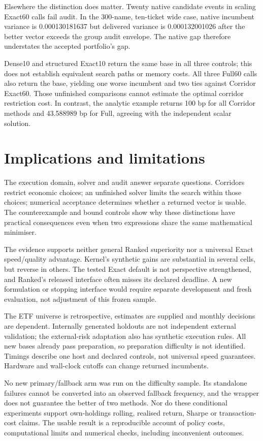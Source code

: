 \documentclass[preprint,12pt,authoryear]{elsarticle}
\begin{document}
Elsewhere the distinction does matter. Twenty native candidate events in
scaling Exact60 calls fail audit. In the 300-name, ten-ticket wide case,
native incumbent variance is 0.000130181637 but delivered variance is
0.000132001026 after the better vector exceeds the group audit envelope.
The native gap therefore understates the accepted portfolio's gap.

Dense10 and structured Exact10 return the same base in all three controls;
this does not establish equivalent search paths or memory costs. All three
Full60 calls also return the base, yielding one worse incumbent and two ties
against Corridor Exact60. Those unfinished comparisons cannot estimate the
optimal corridor restriction cost. In contrast, the analytic example returns
100 bp for all Corridor methods and 43.588989 bp for Full, agreeing with the
independent scalar solution.

\section{Implications and limitations}
The execution domain, solver and audit answer separate questions. Corridors
restrict economic choices; an unfinished solver limits the search within those
choices; numerical acceptance determines whether a returned vector is usable.
The counterexample and bound controls show why these distinctions have practical
consequences even when two expressions share the same mathematical minimiser.

The evidence supports neither general Ranked superiority nor a universal Exact
speed/quality advantage. Kernel's synthetic gains are substantial in several
cells, but reverse in others. The tested Exact default is not perspective
strengthened, and Ranked's released interface often misses its declared deadline.
A new formulation or stopping interface would require separate development and
fresh evaluation, not adjustment of this frozen sample.

The ETF universe is retrospective, estimates are supplied and monthly decisions
are dependent. Internally generated holdouts are not independent external
validation; the external-risk adaptation also has synthetic execution rules.
All new bases already pass preparation, so preparation difficulty is not
identified. Timings describe one host and declared controls, not universal
speed guarantees. Hardware and wall-clock cutoffs can change returned incumbents.

No new primary/fallback arm was run on the difficulty sample. Its standalone
failures cannot be converted into an observed fallback frequency, and the
wrapper does not guarantee the better of two methods. Nor do these conditional
experiments support own-holdings rolling, realised return, Sharpe or transaction-
cost claims. The usable result is a reproducible account of policy costs,
computational limits and numerical checks, including inconvenient outcomes.
\end{document}
